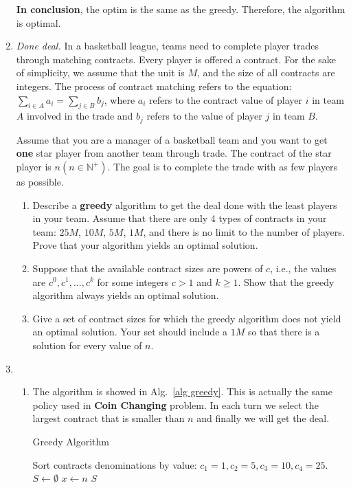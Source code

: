 \documentclass[12pt,a4paper]{article}
\makeatletter
\newtheorem*{solution}{Solution}
\theoremstyle{definition}
\renewenvironment{solution}[1][Solution] {\par\pushQED{\qed}\normalfont\topsep6\p@\@plus6\p@\relax\trivlist\item[\hskip\labelsep\bfseries#1\@addpunct{.}]\ignorespaces}{\popQED\endtrivlist\@endpefalse} \makeatother
\makeatother
\begin{document}
\begin{enumerate}
\textbf{In conclusion}, the optim is the same as the greedy. Therefore, the algorithm is optimal.	
	\item \textit{Done deal.} In a basketball league, teams need to complete player trades through matching contracts. Every player is offered a contract. For the sake of simplicity, we assume that the unit is $ M $, and the size of all contracts are integers. The process of contract matching refers to the equation: $ \sum_{i\in A} a_{i}=\sum_{j\in B} b_{j} $, where $ a_{i} $ refers to the contract value of player $ i $ in team $A$ involved in the trade and $ b_{j} $ refers to the value of player $ j $ in team $B$. 
	
	Assume that you are a manager of a basketball team and you want to get \textbf{one} star player from another team through trade. The contract of the star player is $ n (n\in \mathbb{N}^+) $. The goal is to complete the trade with as few players as possible. 
	
	\begin{enumerate}
		\item Describe a \textbf{greedy} algorithm to get the deal done with the least players in your team. Assume that there are only 4 types of contracts in your team: $25M$, $ 10M $, $ 5M $, $ 1M $, and there is no limit to the number of players. Prove that your algorithm yields an optimal solution.
		\item Suppose that the available contract sizes are powers of $c$,
		i.e., the values are $c^{0}, c^{1}, \ldots, c^{k}$ for some integers $c>1$ and $k \geq 1$. Show that the greedy algorithm always yields an optimal solution.
		\item Give a set of contract sizes for which the greedy algorithm does not yield an optimal solution. Your set should include a $ 1M $ so that there is a solution for every value of $ n $.
	\end{enumerate}
	
   \begin{solution}
   ~\\
   
   \begin{enumerate}
 
   \item
   The algorithm is showed in Alg.~\ref{alg greedy}. This is actually the same policy used in \textbf{Coin Changing} problem. In each turn we select the largest contract that is smaller than $n$ and finally we will get the deal.
   
   \begin{algorithm}[H]
   \caption{Greedy Algorithm}\label{alg greedy}
		Sort contracts denominations by value: $c_1=1, c_2=5, c_3=10, c_4=25$.\;
		$S\leftarrow \emptyset$\;
		$x\leftarrow n$\;
		\Return $S$\;
		

\end{algorithm}
\end{enumerate}
\end{solution}
\end{enumerate}
\end{document}
